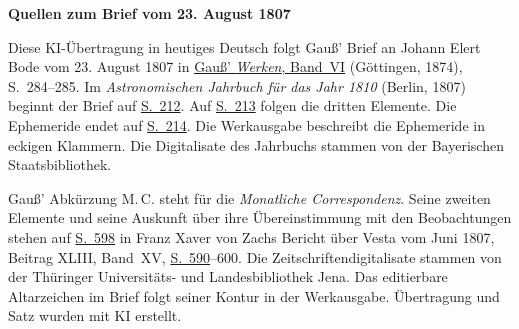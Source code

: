 \clearpage\thispagestyle{empty}
\begin{center}\textbf{Quellen zum Brief vom 23. August 1807}\end{center}
\noindent Diese KI-Übertragung in heutiges Deutsch folgt Gauß’ Brief an Johann Elert Bode vom 23. August 1807 in \href{https://gdz.sub.uni-goettingen.de/id/PPN236007467}{Gauß’ \textit{Werken}, Band~VI} (Göttingen, 1874), S.~284--285. Im \textit{Astronomischen Jahrbuch für das Jahr 1810} (Berlin, 1807) beginnt der Brief auf \href{https://www.digitale-sammlungen.de/en/view/bsb10538339?page=222}{S.~212}. Auf \href{https://www.digitale-sammlungen.de/en/view/bsb10538339?page=223}{S.~213} folgen die dritten Elemente. Die Ephemeride endet auf \href{https://www.digitale-sammlungen.de/en/view/bsb10538339?page=224}{S.~214}. Die Werkausgabe beschreibt die Ephemeride in eckigen Klammern. Die Digitalisate des Jahrbuchs stammen von der Bayerischen Staatsbibliothek.
\par\medskip
Gauß’ Abkürzung M.\,C. steht für die \textit{Monatliche Correspondenz}. Seine zweiten Elemente und seine Auskunft über ihre Übereinstimmung mit den Beobachtungen stehen auf \href{https://zs.thulb.uni-jena.de/rsc/viewer/jportal_derivate_00237836/Monatliche_Correspondenz_130168688_15_1807_0605.tif}{S.~598} in Franz Xaver von Zachs Bericht über Vesta vom Juni 1807, Beitrag XLIII, Band~XV, \href{https://zs.thulb.uni-jena.de/rsc/viewer/jportal_derivate_00237836/Monatliche_Correspondenz_130168688_15_1807_0597.tif}{S.~590}--600. Die Zeitschriftendigitalisate stammen von der Thüringer Universitäts- und Landesbibliothek Jena. Das editierbare Altarzeichen im Brief folgt seiner Kontur in der Werkausgabe. Übertragung und Satz wurden mit KI erstellt.
\clearpage
